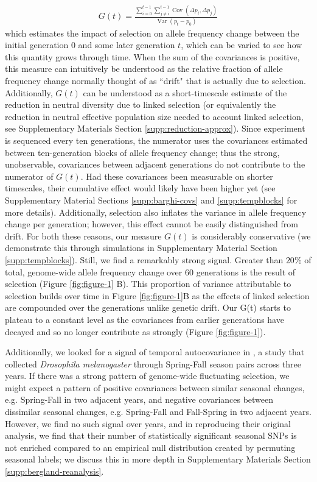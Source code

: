 \documentclass[11pt]{article}
\DeclareMathOperator{\var}{Var}
\DeclareMathOperator{\cov}{Cov}
\begin{document}
\begin{align}
  G(t) = \frac{ \sum_{i=0}^{t-1} \sum_{j \ne i}^{t-1} \cov(\Delta p_i, \Delta p_j)}{\var(p_t - p_0)}
\end{align}
%
which estimates the impact of selection on allele frequency change between
the initial generation $0$ and some later generation $t$, which can be varied
to see how this quantity grows through time. When the sum of the covariances is
positive, this measure can intuitively be understood as the relative fraction
of allele frequency change normally thought of as ``drift" that is actually due
to selection. Additionally, $G(t)$ can be understood as a short-timescale
estimate of the reduction in neutral diversity due to linked selection (or
equivalently the reduction in neutral effective population size needed to
account linked selection, see Supplementary Materials Section
\ref{supp:reduction-approx}). Since \textcite{Barghi2019-qy} experiment is
sequenced every ten generations, the numerator uses the covariances
  estimated between ten-generation blocks of allele frequency change; thus
  the strong, unobservable, covariances between adjacent generations do not
contribute to the numerator of $G(t)$. Had these covariances been measurable
on shorter timescales, their cumulative effect would likely have been higher
yet (see Supplementary Material Sections \ref{supp:barghi-covs} and
\ref{supp:tempblocks} for more details).  Additionally, selection also inflates
the variance in allele frequency change per generation; however, this effect
cannot be easily distinguished from drift. For both these reasons, our measure
$G(t)$ is considerably conservative (we demonstrate this through
simulations in Supplementary Material Section \ref{supp:tempblocks}).  Still,
we find a remarkably strong signal. Greater than $20\%$ of total, genome-wide
allele frequency change over 60 generations is the result of selection (Figure
\ref{fig:figure-1} B). This proportion of variance attributable to selection
builds over time in Figure \ref{fig:figure-1}B as the effects of linked
selection are compounded over the generations unlike genetic drift. Our G(t)
starts to plateau to a constant level as the covariances from earlier
generations have decayed and so no longer contribute as strongly (Figure
\ref{fig:figure-1}).

Additionally, we looked for a signal of temporal autocovariance in
\textcite{Bergland2014-ij}, a study that collected \emph{Drosophila
melanogaster} through Spring-Fall season pairs across three years. If there was
a strong  pattern of genome-wide fluctuating selection, we might expect a
pattern of positive covariances between similar seasonal changes, e.g.
Spring-Fall in two adjacent years, and negative covariances between dissimilar
seasonal changes, e.g. Spring-Fall and Fall-Spring in two adjacent years.
However, we find no such signal over years, and in reproducing their original
analysis, we find that their number of statistically significant seasonal SNPs
is not enriched compared to an empirical null distribution created by permuting
seasonal labels; we discuss this in more depth in Supplementary Materials
Section \ref{supp:bergland-reanalysis}.
\end{document}
